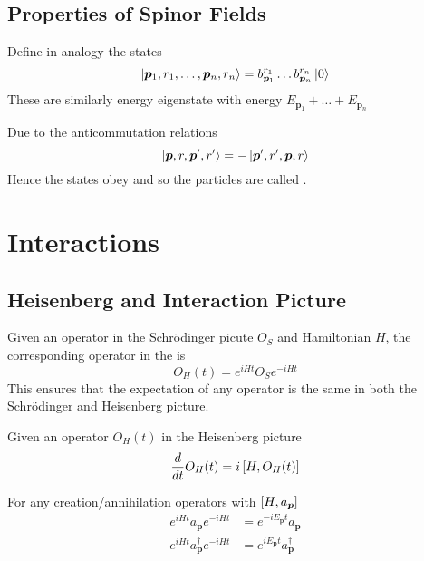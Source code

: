 \documentclass{article}
\begin{document}
\subsection{Properties of Spinor Fields}

\begin{definition}
Define in analogy the states 
\[
\ket{\bm{p}_1,r_1,\dots,\bm{p}_n,r_n} = b_{\bm{p}_1}^{r_1} \dots b_{\bm{p}_n}^{r_n} \ket{0}
\]
These are similarly energy eigenstate with energy $E_{\bm{p}_1}+\dots+E_{\bm{p}_n}$
\end{definition}

\begin{theorem}
Due to the anticommutation relations 
\[
\ket{\bm{p},r,\bm{p}^\prime,r^\prime}=-\ket{\bm{p}^\prime,r^\prime,\bm{p},r}
\]
Hence the states obey  and so the particles are called .  
\end{theorem}
\section{Interactions}

\subsection{Heisenberg and Interaction Picture}

\begin{definition}
Given an operator in the Schr\"odinger picute $O_S$ and Hamiltonian $H$, the corresponding operator in the  is 
\[
O_H (t) = e^{iHt} O_S e^{-iHt}
\]
This ensures that the expectation of any operator is the same in both the Schr\"odinger and Heisenberg picture. 
\end{definition}

\begin{theorem}
Given an operator $O_H(t)$ in the Heisenberg picture 
\[
\frac{d}{dt} O_H(t) = i \comm[H]{O_H(t)}
\]
\end{theorem}

\begin{theorem}
For any creation/annihilation operators with $\comm[H]{a_{\bm{p}}}$
\begin{align*}
e^{iHt} a_{\bm{p}}  e^{-iHt} &= e^{-iE_{\bm{p}}t} a_{\bm{p}} \\
e^{iHt} a_{\bm{p}}^\dagger  e^{-iHt} &= e^{iE_{\bm{p}}t} a_{\bm{p}}^\dagger
\end{align*}
\end{theorem}
\end{document}

